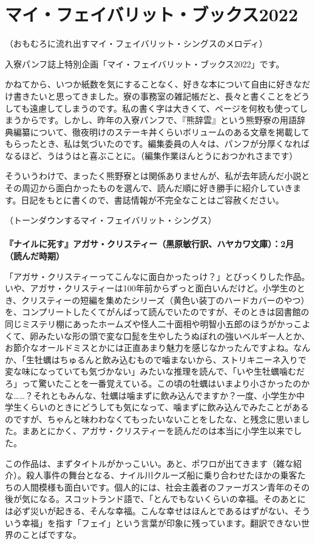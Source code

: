 \section{マイ・フェイバリット・ブックス2022}\label{sec:favorite_books}

（おもむろに流れ出すマイ・フェイバリット・シングスのメロディ）

入寮パンフ誌上特別企画「マイ・フェイバリット・ブックス2022」です。

かねてから、いつか紙数を気にすることなく、好きな本について自由に好きなだけ書きたいと思ってきました。寮の事務室の雑記帳だと、長々と書くことをどうしても遠慮してしまうのです。私の書く字は大きくて、ページを何枚も使ってしまうからです。しかし、昨年の入寮パンフで、『熊辞雲』という熊野寮の用語辞典編纂について、徹夜明けのステーキ丼くらいボリュームのある文章を掲載してもらったとき、私は気づいたのです。編集委員の人々は、パンフが分厚くなればなるほど、うはうはと喜ぶことに。（編集作業ほんとうにおつかれさまです）

そういうわけで、まったく熊野寮とは関係ありませんが、私が去年読んだ小説とその周辺から面白かったものを選んで、読んだ順に好き勝手に紹介していきます。日記をもとに書くので、書誌情報が不完全なことはご容赦ください。

（トーンダウンするマイ・フェイバリット・シングス）
\\
\\
\textbf{『ナイルに死す』アガサ・クリスティー（黒原敏行訳、ハヤカワ文庫）：2月（読んだ時期）}

「アガサ・クリスティーってこんなに面白かったっけ？」とびっくりした作品。いや、アガサ・クリスティーは100年前からずっと面白いんだけど。小学生のとき、クリスティーの短編を集めたシリーズ（黄色い装丁のハードカバーのやつ）を、コンプリートしたくてがんばって読んでいたのですが、そのときは図書館の同じミステリ棚にあったホームズや怪人二十面相や明智小五郎のほうがかっこよくて、卵みたいな形の頭で変な口髭を生やしたうぬぼれの強いベルギー人とか、お節介なオールドミスとかには正直あまり魅力を感じなかったんですよね。なんか、「生牡蠣はちゅるんと飲み込むもので噛まないから、ストリキニーネ入りで変な味になっていても気づかない」みたいな推理を読んで、「いや生牡蠣噛むだろ」って驚いたことを一番覚えている。この頃の牡蠣はいまより小さかったのかな……？それともみんな、牡蠣は噛まずに飲み込んでますか？一度、小学生か中学生くらいのときにどうしても気になって、噛まずに飲み込んでみたことがあるのですが、ちゃんと味わわなくてもったいないことをしたな、と残念に思いました。まあとにかく、アガサ・クリスティーを読んだのは本当に小学生以来でした。

この作品は、まずタイトルがかっこいい。あと、ポワロが出てきます（雑な紹介）。殺人事件の舞台となる、ナイル川クルーズ船に乗り合わせたほかの乗客たちの人間模様も面白いです。個人的には、社会主義者のファーガスン青年のその後が気になる。スコットランド語で、「とんでもないくらいの幸福。そのあとには必ず災いが起きる、そんな幸福。こんな幸せはほんとであるはずがない、そういう幸福」を指す「フェイ」という言葉が印象に残っています。翻訳できない世界のことばですな。

